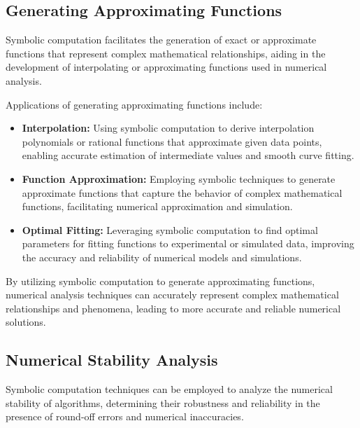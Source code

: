 \subsection{Generating Approximating Functions}

Symbolic computation facilitates the generation of exact or approximate functions that represent complex mathematical relationships, aiding in the development of interpolating or approximating functions used in numerical analysis.

Applications of generating approximating functions include:
%
\begin{itemize}
  \setlength{\itemsep}{0.0em}
  \item \textbf{Interpolation:} Using symbolic computation to derive interpolation polynomials or rational functions that approximate given data points, enabling accurate estimation of intermediate values and smooth curve fitting.
  \item \textbf{Function Approximation:} Employing symbolic techniques to generate approximate functions that capture the behavior of complex mathematical functions, facilitating numerical approximation and simulation.
  \item \textbf{Optimal Fitting:} Leveraging symbolic computation to find optimal parameters for fitting functions to experimental or simulated data, improving the accuracy and reliability of numerical models and simulations.
\end{itemize}
%
By utilizing symbolic computation to generate approximating functions, numerical analysis techniques can accurately represent complex mathematical relationships and phenomena, leading to more accurate and reliable numerical solutions.

\subsection{Numerical Stability Analysis}

Symbolic computation techniques can be employed to analyze the numerical stability of algorithms, determining their robustness and reliability in the presence of round-off errors and numerical inaccuracies.

